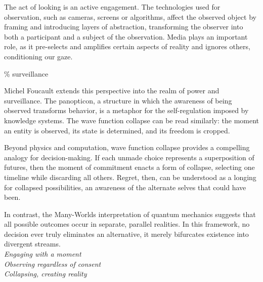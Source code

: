 The act of looking is an active engagement. The technologies used for observation, such as cameras, screens or algorithms, affect the observed object by framing and introducing layers of abstraction, transforming the observer into both a participant and a subject of the observation. Media plays an important role, as it pre-selects and amplifies certain aspects of reality and ignores others, conditioning our gaze.


{\scriptsize \textcolor{comment}{\%  surveillance }}

Michel Foucault extends this perspective into the realm of power and surveillance. The panopticon, a structure in which the awareness of being observed transforms behavior, is a metaphor for the self-regulation imposed by knowledge systems. The wave function collapse can be read similarly: the moment an entity is observed, its state is determined, and its freedom is cropped. \citep{foucault1975}

Beyond physics and computation, wave function collapse provides a compelling analogy for decision-making. If each unmade choice represents a superposition of futures, then the moment of commitment enacts a form of collapse, selecting one timeline while discarding all others. Regret, then, can be understood as a longing for collapsed possibilities, an awareness of the alternate selves that could have been.

In contrast, the Many-Worlds interpretation of quantum mechanics suggests that all possible outcomes occur in separate, parallel realities. In this framework, no decision ever truly eliminates an alternative, it merely bifurcates existence into divergent streams.
\\
 
\textit{Engaging with a moment\\Observing regardless of consent\\Collapsing, creating reality}


